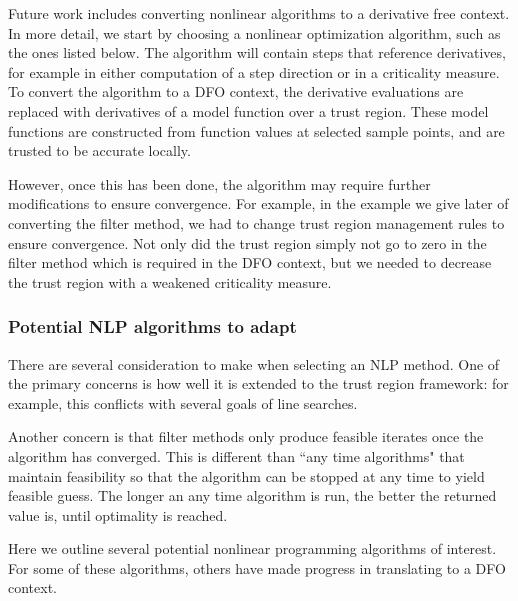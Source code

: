 \documentclass{article}
\begin{document}
Future work includes converting nonlinear algorithms to a derivative free context.
In more detail, we start by choosing a nonlinear optimization algorithm, such as the ones listed below.
The algorithm will contain steps that reference derivatives, for example in either computation of a step direction or in a criticality measure.
To convert the algorithm to a DFO context, the derivative evaluations are replaced with derivatives of a model function over a trust region.
These model functions are constructed from function values at selected sample points, and are trusted to be accurate locally.


\underline{\hspace{8cm}}

However, once this has been done, the algorithm may require further modifications to ensure convergence.
For example, in the example we give later of converting the filter method, we had to change trust region management rules to ensure convergence.
Not only did the trust region simply not go to zero in the filter method which is required in the DFO context, but we needed to decrease the trust region with a weakened criticality measure.

\underline{\hspace{8cm}}

\subsubsection{Potential NLP algorithms to adapt}

There are several consideration to make when selecting an NLP method.
One of the primary concerns is how well it is extended to the trust region framework: for example, this conflicts with several goals of line searches.

Another concern is that filter methods only produce feasible iterates once the algorithm has converged.
This is different than ``any time algorithms" that maintain feasibility so that the algorithm can be stopped at any time to yield feasible guess.
The longer an any time algorithm is run, the better the returned value is, until optimality is reached.

Here we outline several potential nonlinear programming algorithms of interest.
For some of these algorithms, others have made progress in translating to a DFO context.
\end{document}
